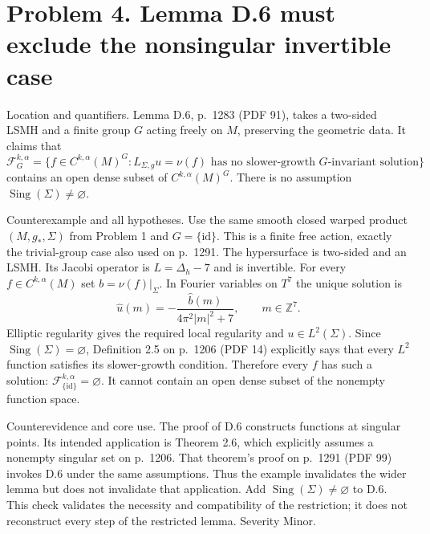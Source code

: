 \documentclass[10pt]{article}
\begin{document}
\section*{Problem 4. Lemma D.6 must exclude the nonsingular invertible case}
Location and quantifiers. Lemma D.6, p. 1283 (PDF 91), takes a two-sided LSMH and a finite group \(G\) acting freely on \(M\), preserving the geometric data. It claims that \[\mathcal F_G^{k,\alpha}=
 \{f\in C^{k,\alpha}(M)^G:
 L_{\Sigma,g}u=\nu(f)
 \text{ has no slower-growth $G$-invariant solution}\}\] contains an open dense subset of \(C^{k,\alpha}(M)^G\). There is no assumption \(\operatorname{Sing}(\Sigma)\ne\varnothing\).\par
Counterexample and all hypotheses. Use the same smooth closed warped product \((M,g_*,\Sigma)\) from Problem 1 and \(G=\{\mathrm{id}\}\). This is a finite free action, exactly the trivial-group case also used on p. 1291. The hypersurface is two-sided and an LSMH. Its Jacobi operator is \(L=\Delta_h-7\) and is invertible. For every \(f\in C^{k,\alpha}(M)\) set \(b=\nu(f)|_\Sigma\). In Fourier variables on \(T^7\) the unique solution is \[\widehat u(m)=-\frac{\widehat b(m)}
                      {4\pi^2|m|^2+7},\qquad m\in\mathbb Z^7.\] Elliptic regularity gives the required local regularity and \(u\in L^2(\Sigma)\). Since \(\operatorname{Sing}(\Sigma)=\varnothing\), Definition 2.5 on p. 1206 (PDF 14) explicitly says that every \(L^2\) function satisfies its slower-growth condition. Therefore every \(f\) has such a solution: \(\mathcal F_{\{\mathrm{id}\}}^{k,\alpha}=\varnothing\). It cannot contain an open dense subset of the nonempty function space.\par
Counterevidence and core use. The proof of D.6 constructs functions at singular points. Its intended application is Theorem 2.6, which explicitly assumes a nonempty singular set on p. 1206. That theorem’s proof on p. 1291 (PDF 99) invokes D.6 under the same assumptions. Thus the example invalidates the wider lemma but does not invalidate that application. Add \(\operatorname{Sing}(\Sigma)\ne\varnothing\) to D.6. This check validates the necessity and compatibility of the restriction; it does not reconstruct every step of the restricted lemma. Severity Minor.\par
\end{document}
